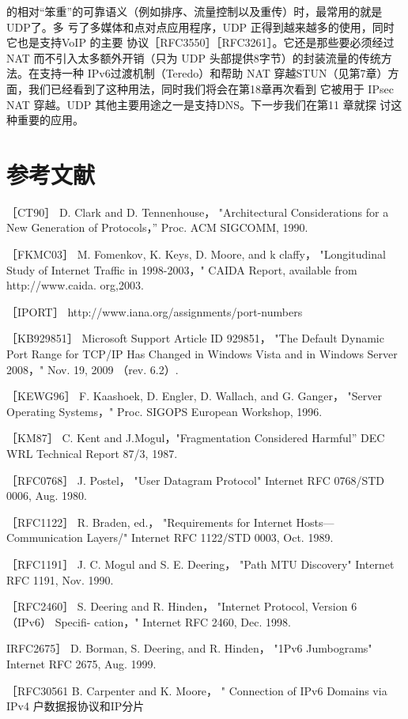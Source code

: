 的相对“笨重”的可靠语义（例如排序、流量控制以及重传）时，最常用的就是UDP了。多
亏了多媒体和点对点应用程序，UDP 正得到越来越多的使用，同时它也是支持VoIP 的主要
协议［RFC3550］［RFC3261］。它还是那些要必须经过 NAT 而不引入太多额外开销（只为 UDP
头部提供8字节）的封装流量的传统方法。在支持一种 IPv6过渡机制（Teredo）和帮助 NAT
穿越STUN（见第7章）方面，我们已经看到了这种用法，同时我们将会在第18章再次看到
它被用于 IPsec NAT 穿越。UDP 其他主要用途之一是支持DNS。下一步我们在第11 章就探
讨这种重要的应用。

\section{参考文献}
［CT90］ D. Clark and D. Tennenhouse， "Architectural Considerations for a New
Generation of Protocols，” Proc. ACM SIGCOMM, 1990.

［FKMC03］ M. Fomenkov, K. Keys, D. Moore, and k claffy， "Longitudinal Study of
Internet Traffic in 1998-2003，" CAIDA Report, available from http://www.caida.
org,2003.

［IPORT］ http://www.iana.org/assignments/port-numbers

［KB929851］ Microsoft Support Article ID 929851， "The Default Dynamic Port
Range for TCP/IP Has Changed in Windows Vista and in Windows Server 2008，"
Nov. 19, 2009 （rev. 6.2）.

［KEWG96］ F. Kaashoek, D. Engler, D. Wallach, and G. Ganger， "Server Operating
Systems，" Proc. SIGOPS European Workshop, 1996.

［KM87］ C. Kent and J.Mogul，"Fragmentation Considered Harmful” DEC WRL
Technical Report 87/3, 1987.

［RFC0768］ J. Postel， "User Datagram Protocol" Internet RFC 0768/STD 0006, Aug.
1980.

［RFC1122］ R. Braden, ed.， "Requirements for Internet Hosts—Communication
Layers/" Internet RFC 1122/STD 0003, Oct. 1989.

［RFC1191］ J. C. Mogul and S. E. Deering， "Path MTU Discovery" Internet RFC
1191, Nov. 1990.

［RFC2460］ S. Deering and R. Hinden， "Internet Protocol, Version 6 （IPv6） Specifi-
cation，" Internet RFC 2460, Dec. 1998.

IRFC2675］ D. Borman, S. Deering, and R. Hinden， "1Pv6 Jumbograms" Internet
RFC 2675, Aug. 1999.

［RFC30561 B. Carpenter and K. Moore， " Connection of IPv6 Domains via IPv4
户数据报协议和IP分片

